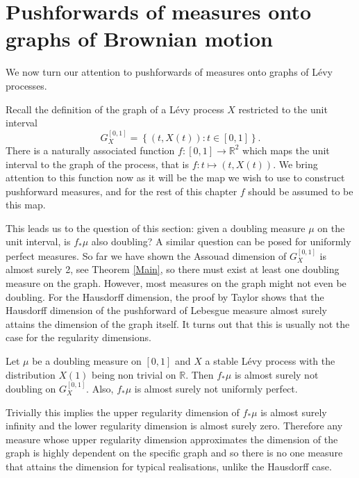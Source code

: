 \section{Pushforwards of measures onto graphs of Brownian motion}


We now turn our attention to pushforwards of measures onto graphs of L\'evy processes.


Recall the definition of the graph of a L\'evy process $X$ restricted to the unit interval
\[
G_X^{[0,1]} = \left\{ (t,X(t)) \colon t \in [0,1] \right\}.
\]
There is a naturally associated function $f: [0,1] \rightarrow \mathbb{R}^2$ which maps the unit interval to the graph of the process, that is $f\colon t \mapsto (t,X(t))$. We bring attention to this function now as it will be the map we wish to use to construct pushforward measures, and for the rest of this chapter $f$ should be assumed to be this map. 





This leads us to the question of this section: given a doubling measure $\mu$ on the unit interval, is $f_*\mu$ also doubling? A similar question can be posed for uniformly perfect measures. So far we have shown the Assouad dimension of $G_X^{[0,1]}$ is almost surely 2, see Theorem \ref{Main}, so there must exist at least one doubling measure on the graph. However, most measures on the graph might not even be doubling. For the Hausdorff dimension, the proof by Taylor shows that the Hausdorff dimension of the pushforward of Lebesgue measure almost surely attains the dimension of the graph itself. It turns out that this is usually not the case for the regularity dimensions.

\begin{theorem}\label{brownianthm}
	Let $\mu$ be a doubling measure on $[0,1]$ and $X$ a stable L\'evy process with the distribution $X(1)$ being non trivial on $\mathbb{R}$. Then $f_*\mu$ is almost surely not doubling on $G_X^{[0,1]}$. Also, $f_*\mu$ is almost surely not uniformly perfect.
\end{theorem}


Trivially this implies the upper regularity dimension of $f_*\mu$ is almost surely infinity and the lower regularity dimension is almost surely zero. Therefore any measure whose upper regularity dimension approximates the dimension of the graph is highly dependent on the specific graph and so there is no one measure that attains the dimension for typical realisations, unlike the Hausdorff case. 

